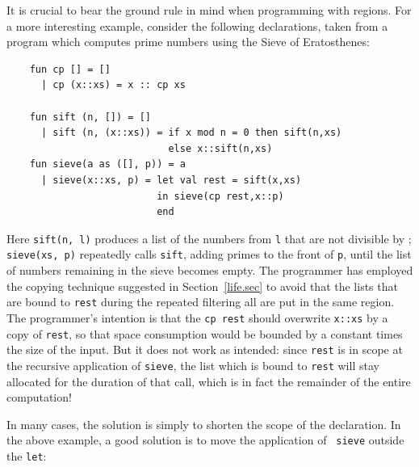 \documentclass[12pt]{book}
\begin{document}
It is crucial to bear the ground rule in mind when programming with regions.
For a more interesting example, consider the following declarations, taken from a program which
computes prime numbers using the Sieve of Eratosthenes:
\begin{verbatim}
    fun cp [] = []
      | cp (x::xs) = x :: cp xs 

    fun sift (n, []) = []
      | sift (n, (x::xs)) = if x mod n = 0 then sift(n,xs)
                            else x::sift(n,xs)
    fun sieve(a as ([], p)) = a
      | sieve(x::xs, p) = let val rest = sift(x,xs)
                          in sieve(cp rest,x::p)
                          end
\end{verbatim}
Here {\tt sift(n, l)} produces a list of the numbers from {\tt l} that
are not divisible by ; {\tt sieve(xs, p)} repeatedly calls
{\tt sift}, adding primes to the front of {\tt p}, until the list of numbers
remaining in the sieve becomes empty. The programmer has employed the copying
technique suggested in Section~\ref{life.sec} to avoid that the 
lists that are bound to {\tt rest} during the repeated filtering
all are  put in the same region. The programmer's intention is that the
{\tt cp rest} should overwrite {\tt x::xs} by a copy of {\tt rest}, so
that space consumption would be bounded by a constant times the size of
the input.  But it does not work as intended: since {\tt rest}
is in scope at the recursive application of {\tt sieve}, the list which
is bound to {\tt rest} will stay
allocated for the duration of that call, which is in fact the remainder of
the entire computation! 

In many cases, the solution is simply to shorten the scope of the declaration. 
In the above example, a good solution is to move the application of {\tt
sieve} outside the {\tt let}:\pagebreak
\end{document}
